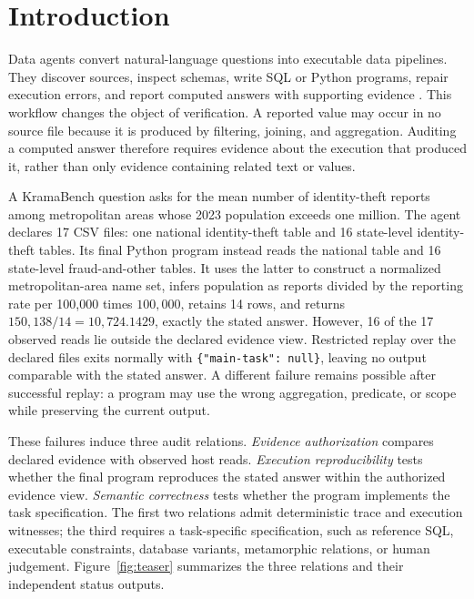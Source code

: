 \section{Introduction}\label{sec:intro}

Data agents convert natural-language questions into executable data
pipelines. They discover sources, inspect schemas, write SQL or Python
programs, repair execution errors, and report computed answers with
supporting evidence \citep{kramabench2025,dabstep2025,lakeqa2026}.
This workflow changes the object of verification. A reported value may
occur in no source file because it is produced by filtering, joining,
and aggregation. Auditing a computed answer therefore requires evidence
about the execution that produced it, rather than only evidence containing
related text or values.

A KramaBench question asks for the mean number of identity-theft reports
among metropolitan areas whose 2023 population exceeds one million. The
agent declares 17 CSV files: one national identity-theft table and 16
state-level identity-theft tables. Its final Python program instead reads
the national table and 16 state-level fraud-and-other tables. It uses the
latter to construct a normalized metropolitan-area name set, infers
population as reports divided by the reporting rate per 100,000 times
$100{,}000$, retains 14 rows, and returns
$150{,}138/14=10{,}724.1429$, exactly the stated answer. However, 16 of
the 17 observed reads lie outside the declared evidence view. Restricted
replay over the declared files exits normally with
\texttt{\{"main-task": null\}}, leaving no output comparable with the
stated answer. A different failure remains possible after successful
replay: a program may use the wrong aggregation, predicate, or scope while
preserving the current output.

These failures induce three audit relations. \emph{Evidence
authorization} compares declared evidence with observed host reads.
\emph{Execution reproducibility} tests whether the final program
reproduces the stated answer within the authorized evidence view.
\emph{Semantic correctness} tests whether the program implements the
task specification. The first two relations admit deterministic trace and
execution witnesses; the third requires a task-specific specification,
such as reference SQL, executable constraints, database variants,
metamorphic relations, or human judgement. Figure~\ref{fig:teaser}
summarizes the three relations and their independent status outputs.

